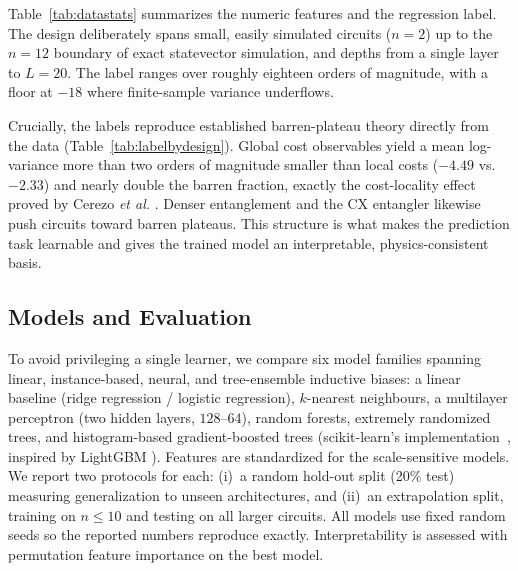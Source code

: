 \documentclass{ieeeaccess}
\newcommand{\Nrows}{20{,}000}
\newcommand{\ExtrapCut}{10}
\begin{document}
\begin{table}[!t]
\caption{Sampled design space. Each spec draws these parameters independently and
uniformly.}
\label{tab:designspace}
\centering

\end{table}

Table~\ref{tab:datastats} summarizes the numeric features and the regression label.
The design deliberately spans small, easily simulated circuits ($n=2$) up to the
$n=12$ boundary of exact statevector simulation, and depths from a single layer to
$L=20$. The label ranges over roughly eighteen orders of magnitude, with a floor at
$-18$ where finite-sample variance underflows.

\begin{table}[!t]
\caption{Descriptive statistics of the numeric features and the trainability label
over all \Nrows{} circuits.}
\label{tab:datastats}
\centering

\end{table}

Crucially, the labels reproduce established barren-plateau theory directly from the
data (Table~\ref{tab:labelbydesign}). Global cost observables yield a mean
log-variance more than two orders of magnitude smaller than local costs ($-4.49$
vs. $-2.33$) and nearly double the barren fraction, exactly the cost-locality
effect proved by Cerezo \emph{et al.} \cite{cerezo2021cost}. Denser entanglement
and the CX entangler likewise push circuits toward barren plateaus. This structure
is what makes the prediction task learnable and gives the trained model an
interpretable, physics-consistent basis.

\begin{table}[!t]
\caption{Trainability broken down by design choice. Lower mean log-variance and
higher barren percentage indicate less trainable families.}
\label{tab:labelbydesign}
\centering

\end{table}

\subsection{Models and Evaluation}
To avoid privileging a single learner, we compare six model families spanning
linear, instance-based, neural, and tree-ensemble inductive biases: a linear
baseline (ridge regression / logistic regression), $k$-nearest neighbours, a
multilayer perceptron (two hidden layers, $128$--$64$), random forests, extremely
randomized trees, and histogram-based gradient-boosted trees (scikit-learn's
implementation~\cite{pedregosa2011scikit}, inspired by LightGBM
\cite{ke2017lightgbm}). Features are standardized for the
scale-sensitive models. We report two protocols for each: (i)~a random hold-out
split (20\% test) measuring generalization to unseen architectures, and (ii)~an
extrapolation split, training on $n\le\ExtrapCut{}$ and testing on all larger
circuits. All models use fixed random seeds so the reported numbers reproduce
exactly. Interpretability is assessed with permutation feature importance on the
best model.
\end{document}
